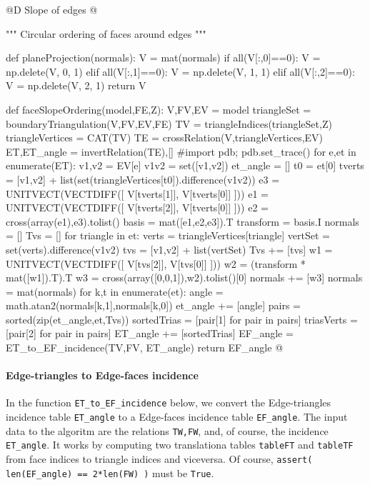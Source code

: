 \documentclass[11pt,oneside]{article}    %
\begin{document}
@D Slope of edges
@{""" Circular ordering of faces around edges """

def planeProjection(normals):
    V = mat(normals)
    if all(V[:,0]==0): V = np.delete(V, 0, 1)
    elif all(V[:,1]==0): V = np.delete(V, 1, 1)
    elif all(V[:,2]==0): V = np.delete(V, 2, 1)
    return V

def faceSlopeOrdering(model,FE,Z):
    V,FV,EV = model
    triangleSet = boundaryTriangulation(V,FV,EV,FE)
    TV = triangleIndices(triangleSet,Z)
    triangleVertices = CAT(TV)
    TE = crossRelation(V,triangleVertices,EV)
    ET,ET_angle = invertRelation(TE),[]
    #import pdb; pdb.set_trace()
    for e,et in enumerate(ET):
        v1,v2 = EV[e]
        v1v2 = set([v1,v2])
        et_angle = []
        t0 = et[0]
        tverts = [v1,v2] + list(set(triangleVertices[t0]).difference(v1v2))
        e3 = UNITVECT(VECTDIFF([ V[tverts[1]], V[tverts[0]] ]))
        e1 = UNITVECT(VECTDIFF([ V[tverts[2]], V[tverts[0]] ]))
        e2 = cross(array(e1),e3).tolist()
        basis = mat([e1,e2,e3]).T
        transform = basis.I
        normals = []
        Tvs = []
        for triangle in et:
            verts = triangleVertices[triangle]
            vertSet = set(verts).difference(v1v2)
            tvs = [v1,v2] + list(vertSet)
            Tvs += [tvs]
            w1 = UNITVECT(VECTDIFF([ V[tvs[2]], V[tvs[0]] ]))
            w2 = (transform * mat([w1]).T).T
            w3 = cross(array([0,0,1]),w2).tolist()[0]
            normals += [w3]
        normals = mat(normals)
        for k,t in enumerate(et):
            angle = math.atan2(normals[k,1],normals[k,0])
            et_angle += [angle]
        pairs = sorted(zip(et_angle,et,Tvs))
        sortedTrias = [pair[1] for pair in pairs]
        triasVerts = [pair[2] for pair in pairs]
        ET_angle += [sortedTrias]
    EF_angle = ET_to_EF_incidence(TV,FV, ET_angle)
    return EF_angle
@}



\paragraph{Edge-triangles to Edge-faces incidence}

In the function \texttt{ET\_to\_EF\_incidence} below, we convert the Edge-triangles incidence table \texttt{ET\_angle} to a Edge-faces incidence table \texttt{EF\_angle}. The input data to the algoritm are the relations \texttt{TW,FW}, and, of course, the incidence \texttt{ET\_angle}. It works by computing two translationa tables \texttt{tableFT} and \texttt{tableTF} from face indices to triangle indices and viceversa. Of course, \texttt{assert( len(EF\_angle) == 2*len(FW) )} must be \texttt{True}.
\end{document}
